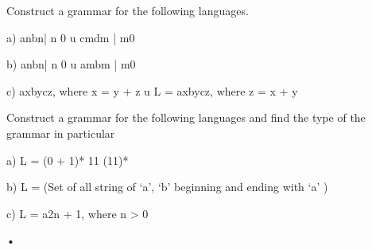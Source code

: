 \documentclass[14pt]{beamer}
\begin{document}
 
 Construct a grammar for the following languages.
 
 
 a) { anbn| n 0} u {cmdm | m0 }


b) { anbn| n 0} u {ambm | m0 }
 
 c) { axbycz, where x = y + z } u { L = axbycz, where z = x + y}
 
 
 Construct a grammar for the following languages and find the type of the grammar in particular
 
 
 a) L = (0 + 1)* 11 (11)*
 
 
 b) L = (Set of all string of ‘a’, ‘b’ beginning and ending with ‘a’ )
 
 
 c) L = a2n + 1, where n > 0

\begin{frame}
\titlepage
\end{frame}


\begin{frame}{•}
 
\end{frame}
\end{document}
